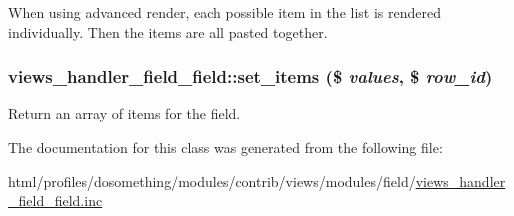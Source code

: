 When using advanced render, each possible item in the list is rendered individually. Then the items are all pasted together. \hypertarget{classviews__handler__field__field_aa834effe6f1071658de6ae2bdbc8cd7b}{
\subsubsection[{set\_\-items}]{\setlength{\rightskip}{0pt plus 5cm}views\_\-handler\_\-field\_\-field::set\_\-items (\$ {\em values}, \/  \$ {\em row\_\-id})}}
\label{classviews__handler__field__field_aa834effe6f1071658de6ae2bdbc8cd7b}
Return an array of items for the field. 

The documentation for this class was generated from the following file:\begin{DoxyCompactItemize}
\item 
html/profiles/dosomething/modules/contrib/views/modules/field/\hyperlink{views__handler__field__field_8inc}{views\_\-handler\_\-field\_\-field.inc}\end{DoxyCompactItemize}
